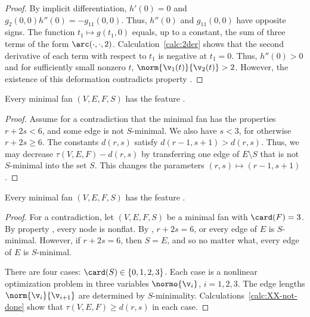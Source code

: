 \begin{proof}
By implicit differentiation, $h'(0) = 0$ and $g_2(0,0) h''(0) =
-g_{11}(0,0)$.  Thus, $h''(0)$ and $g_{11}(0,0)$ have opposite signs.
The function $t_1\mapsto g(t_1,0)$ equals, up to a constant, the sum
of three terms of the form $\arc(\cdot,\cdot,2)$.
Calculation~\ref{calc:2der} shows that the second derivative of each
term with respect to $t_1$ is negative at $t_1=0$.  Thus, $h''(0)>0$
and for sufficiently small nonzero $t$, $\norm{\v_1(t)}{\v_2(t)}>2$.
However, the existence of this deformation contradicts property
.
\end{proof}


\begin{lemma}[] 
Every minimal fan $(V,E,F,S)$ has the feature .
\end{lemma}

\begin{proof} Assume for a contradiction that the minimal fan has the properties  $r+2s < 6$,
and some edge is not $S$-minimal.
We also have $s<3$, for otherwise  $r+2s\ge 6$.
The constants $d(r,s)$ satisfy $d(r-1,s+1) > d(r,s)$.  Thus, we may decrease $\tau(V,E,F)-d(r,s)$
by transferring one edge of $E\setminus S$ that is not $S$-minimal into the set $S$.
This changes the parameters $(r,s)\mapsto (r-1,s+1)$.
\end{proof}

\begin{lemma}[]
Every minimal fan $(V,E,F,S)$ has the feature .
\end{lemma}

\begin{proof}
For a contradiction, let $(V,E,F,S)$ be a minimal fan with $\card(F)=3$.  
By property , every node is nonflat.  By ,  $r+2s=6$,
or every edge of $E$ is $S$-minimal.  However, if  $r+2s=6$, then $S=E$, and so no matter
what, every edge of $E$ is $S$-minimal.

There are four cases: $\card(S)\in\{0,1,2,3\}$.  Each case is a nonlinear optimization problem in
three variables $\normo{\v_i}$, $i=1,2,3$.  The edge lengths $\norm{\v_i}{\v_{i+1}}$ are determined
by $S$-minimality.   Calculations~\ref{calc:XX-not-done} show that $\tau(V,E,F)\ge d(r,s)$ in
each case.
\end{proof}



